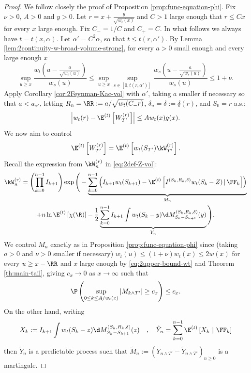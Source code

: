 \documentclass[10pt,a4paper]{article}
\begin{document}
\begin{proof}
We follow closely the proof of Proposition \ref{prop:func-equation-phi}.  
Fix $\nu>0$, $A>0$ and $y>0$. Let $r = x + \frac{y}{\sqrt{w_t(x)}}$ and $C>1$ large enough that $r \leq Cx$ for every $x$ large enough. Fix $C_- = 1/C$ and $C_+ = C$. In what follows we always have $t = t(x,\alpha)$. Let $\alpha' = C^2 \alpha$, so that $t \leq t(r,\alpha')$. 
By Lemma \ref{lem:2continuity-w-broad-volume-strong}, for every $a>0$ small enough and every large enough $x$
\[ \sup_{u\geq x} \frac{w_t\left(u - \frac{a}{\sqrt{w_t(u)}}\right) }{w_s(u)} \leq \sup_{u\geq x} \sup_{s\in [0,t(r,\alpha')]} \frac{w_s\left(u - \frac{a}{\sqrt{w_s(u)}}\right) }{w_s(u)} \leq 1+\nu . \]
Apply Corollary \ref{cor:2Feynman-Kac-vol} with $\alpha'$, taking $a$ smaller if necessary so that $a < a_{\alpha'}$, letting $R_n = \RR := a / \sqrt{w_t(C_- r)}$, $\delta_n = \delta := \underline{\delta}(r)$, and $S_0 = r$ a.s.:
\[ \left| w_t(r) - \E^{(t)}\left[ W^{(r)}_{T'}\right] \right| \leq A w_t(x) g(x) . \]
We now aim to control 
\[ \E^{(t)}\left[ W^{(r)}_{T'}\right] = \E^{(t)}\left[ w_t(S_{T'}) \kW^{(r)}_{T'} \right] . \] 
%
Recall the expression from $\kW^{(r)}_n$ in \eqref{eq:2def-Z-vol}:
\begin{multline*}
\kW^{(r)}_n = \left(\prod_{k=0}^{n-1} I_{k+1} \right) \exp\Bigg( - \underbrace{\sum_{k=0}^{n-1} \left( I_{k+1} w_t(S_{k+1}) - \E^{(t)}\left[I^{(S_k, R_k, \delta)} w_t(S_k - Z) \, | \, \FF_k\right] \right)}_{M_n} \\
+ n \ln\E^{(t)}\left[\chi(\R)\right]  - \frac{1}{2} \underbrace{ \sum_{k=0}^{n-1} I_{k+1} \int w_t(S_{k}-y) \d M_{S_k - S_{k+1}}^{(S_k, R_k, \delta)}(y)}_{Y_n} \Bigg) . 
\end{multline*}
%
We control $M_n$ exactly as in Proposition \ref{prop:func-equation-phi} since (taking $a>0$ and $\nu>0$ smaller if necessary) $w_t(u) \leq (1+\nu) w_t(x) \leq 2 w(x)$ for every $u\geq x-\RR$ and $x$ large enough by \eqref{eq:2upper-bound-wt} and Theorem \ref{th:main-tail}, giving $c_x\to 0$ as $x\to\infty$ such that 
\begin{equation}\label{eq:2controle-Z-1-vol}
\P\left( \sup_{0\leq k \leq A/w_t(x)} |M_{k\wedge T'}| \geq c_x \right) \leq c_x .
\end{equation}
On the other hand, writing 
\[ X_k := I_{k+1} \int w_t(S_{k}-z) \d M_{S_{k}-S_{k+1}}^{(S_k, R_k, \delta)}(z) \quad , \quad \tilde Y_n = \sum_{k=0}^{n-1} \E^{(t)}\left[ X_k \ | \ \FF_k \right] \]
then $\tilde Y_n$ is a predictable process such that $\tilde M_n := (Y_{n\wedge T'} - \tilde Y_{n\wedge T'})_{n\geq 0}$ is a martingale. 

\end{proof}
\end{document}
